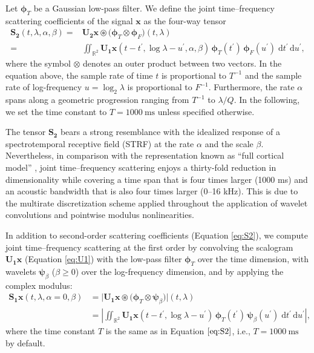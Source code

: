 \documentclass{bmcart}
\makeatletter
\newcommand*{\ie}{i.e.,\@\xspace}
\makeatother
\begin{document}
Let $\boldsymbol{\phi}_T$ be a Gaussian low-pass filter.
We define the joint time--frequency scattering coefficients of the signal $\boldsymbol{x}$ as the four-way tensor
\begin{align}
\mathbf{S_2}(t, \lambda, \alpha, \beta)
=&
\mathbf{U_2}\boldsymbol{x}
\circledast
\big(\boldsymbol{\phi}_T  \otimes \boldsymbol{\phi}_F\big)
(t, \lambda)
\nonumber \\
=&
\iint_{\mathbb{R}^2}
\mathbf{U_1}\boldsymbol{x}(t - t^\prime, \log \lambda - u^\prime, \alpha, \beta)
\,\boldsymbol{\phi}_T (t^\prime)
\,\boldsymbol{\phi}_F (u^\prime)
\;\mathrm{d}t^\prime \, \mathrm{d}u^\prime,
\label{eq:S2}
\end{align}
where the symbol $\otimes$ denotes an outer product between two vectors.
In the equation above, the sample rate of time $t$ is proportional to $T^{-1}$ and the sample rate of log-frequency $u=\log_2 \lambda$ is proportional to $F^{-1}$.
Furthermore, the rate $\alpha$ spans along a geometric progression ranging from $T^{-1}$ to $\lambda/Q$.
In the following, we set the time constant to $T=\SI{1000}{\milli\second}$ unless specified otherwise.

The tensor $\mathbf{S_2}$ bears a strong resemblance with the idealized response of a spectrotemporal receptive field (STRF) at the rate $\alpha$ and the scale $\beta$.
Nevertheless, in comparison with the representation known as ``full cortical model'' \cite{patil2012ploscompbiol}, joint time--frequency scattering enjoys a thirty-fold reduction in dimensionality while covering a time span that is four times larger (1000 ms) and an acoustic bandwidth that is also four times larger (0--16 kHz).
This is due to the multirate discretization scheme applied throughout the application of wavelet convolutions and pointwise modulus nonlinearities.

In addition to second-order scattering coefficients (Equation \ref{eq:S2}), we compute joint time--frequency scattering at the first order by convolving the scalogram $\mathbf{U_1 \boldsymbol{x}}$ (Equation \ref{eq:U1}) with the low-pass filter $\boldsymbol{\phi}_T$ over the time dimension, with wavelets $\boldsymbol{\psi}_{\beta}$ ($\beta \geq0$) over the log-frequency dimension, and by applying the complex modulus:
\begin{align}
\mathbf{S_1}\boldsymbol{x}(t, \lambda, \alpha=0, \beta) &=
\big\vert
\mathbf{U_1}\boldsymbol{x} \circledast
\big(\boldsymbol{\phi}_T \otimes \boldsymbol{\psi}_{\beta} \big)
\big\vert (t, \lambda)
\nonumber \\
&=
\left \vert
\iint_{\mathbb{R}^2}
\mathbf{U_1}\boldsymbol{x}(t - t^\prime, \log \lambda - u^\prime)
\,\boldsymbol{\phi}_T (t^\prime)
\,\boldsymbol{\psi}_{\beta} (u^\prime)
\;\mathrm{d}t^\prime \, \mathrm{d}u^\prime
\right \vert,
\label{eq:S1}
\end{align}
where the time constant $T$ is the same as in Equation $\ref{eq:S2}$, \ie{} $T=\SI{1000}{\milli\second}$ by default.
\end{document}
